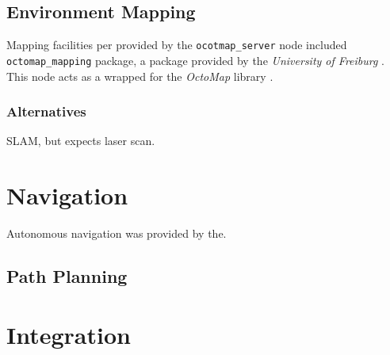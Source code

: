 \subsection{Environment Mapping}

Mapping facilities per provided by the \texttt{ocotmap\_server} node included \texttt{octomap\_mapping} package, a package provided by the \emph{University of Freiburg} \cite{ros_wiki_octomap}. This node acts as a wrapped for the \emph{OctoMap} library \cite{octomap}. 

\subsubsection{Alternatives}

SLAM, but expects laser scan.


\section{Navigation}

Autonomous navigation was provided by the.

\subsection{Path Planning}


\section{Integration}